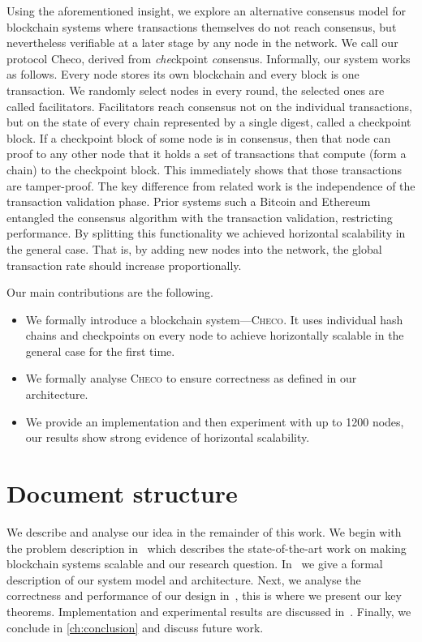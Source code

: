Using the aforementioned insight,
we explore an alternative consensus model for blockchain systems where transactions themselves do not reach consensus,
but nevertheless verifiable at a later stage by any node in the network.
We call our protocol \textsf{Checo}, derived from \emph{che}ckpoint \emph{co}nsensus.
Informally, our system works as follows.
Every node stores its own blockchain and every block is one transaction.
We randomly select nodes in every round, the selected ones are called facilitators.
Facilitators reach consensus not on the individual transactions,
but on the state of every chain represented by a single digest, called a checkpoint block.
If a checkpoint block of some node is in consensus, 
then that node can proof to any other node that it holds a set of transactions that compute (form a chain) to the checkpoint block.
This immediately shows that those transactions are tamper-proof.
The key difference from related work is the independence of the transaction validation phase.
Prior systems such a Bitcoin and Ethereum entangled the consensus algorithm with the transaction validation, restricting performance.
By splitting this functionality we achieved horizontal scalability in the general case.
That is, by adding new nodes into the network, the global transaction rate should increase proportionally.

Our main contributions are the following.
\begin{itemize}
    \item We formally introduce a blockchain system---\textsc{Checo}.
        It uses individual hash chains and checkpoints on every node to achieve
        horizontally scalable in the general case for the first time.
    \item We formally analyse \textsc{Checo} to ensure correctness as defined in our architecture.
    \item We provide an implementation and then experiment with up to 1200 nodes,
        our results show strong evidence of horizontal scalability.
\end{itemize}

\section{Document structure}
We describe and analyse our idea in the remainder of this work.
We begin with the problem description in~ which describes the state-of-the-art work on making blockchain systems scalable and our research question.
In~ we give a formal description of our system model and architecture.
Next, we analyse the correctness and performance of our design in~, this is where we present our key theorems.
Implementation and experimental results are discussed in~.
Finally, we conclude in \ref{ch:conclusion} and discuss future work.
